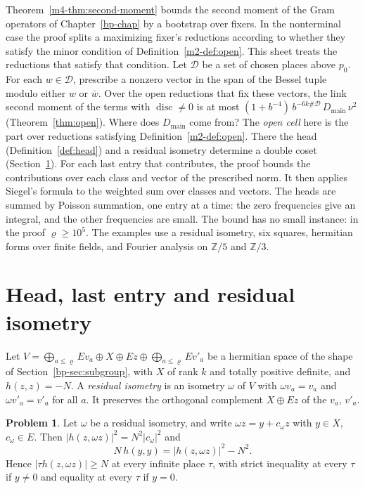\documentclass[reqno]{amsart}
\newcounter{chap}
\theoremstyle{definition}
\newtheorem{problem}{Problem}[section]
\theoremstyle{plain}
\theoremstyle{remark}
\newcommand{\Z}{\mathbb{Z}}
\newcommand{\Dc}{\mathcal{D}}
\newcommand{\disc}{\operatorname{disc}}
\newcommand{\Dm}{D_{\mathrm{main}}}
\begin{document}
\medskip
Theorem~\ref{m4-thm:second-moment} bounds the second moment of the Gram operators of Chapter~\ref{bp-chap} by a bootstrap over fixers.  In the nonterminal case the proof splits a maximizing fixer's reductions according to whether they satisfy the minor condition of Definition~\ref{m2-def:open}.  This sheet treats the reductions that satisfy that condition.  Let \(\Dc\) be a set of chosen places above \(p_0\).  For each \(w\in\Dc\), prescribe a nonzero vector in the span of the Bessel tuple modulo either \(w\) or \(\bar w\).  Over the open reductions that fix these vectors, the link second moment of the terms with \(\disc\ne0\) is at most \((1+b^{-4})\,b^{-6k\#\Dc}\,\Dm\,\nu^2\) (Theorem~\ref{thm:open}).  Where does \(\Dm\) come from?  The \emph{open cell} here is the part over reductions satisfying Definition~\ref{m2-def:open}.  There the head (Definition~\ref{def:head}) and a residual isometry determine a double coset (Section~\ref{sec:last}).  For each last entry that contributes, the proof bounds the contributions over each class and vector of the prescribed norm.  It then applies Siegel's formula to the weighted sum over classes and vectors.  The heads are summed by Poisson summation, one entry at a time: the zero frequencies give an integral, and the other frequencies are small.  The bound has no small instance: in the proof \(\varrho\ge10^5\).  The examples use a residual isometry, six squares, hermitian forms over finite fields, and Fourier analysis on \(\Z/5\) and \(\Z/3\).

\section{Head, last entry and residual isometry}\label{sec:last}

Let \(V=\bigoplus_{a\le\varrho}Ev_a\oplus X\oplus Ez\oplus\bigoplus_{a\le\varrho}Ev'_a\) be a hermitian space of the shape of Section~\ref{bp-sec:subgroup}, with \(X\) of rank \(k\) and totally positive definite, and \(h(z,z)=-N\).  A \emph{residual isometry} is an isometry \(\omega\) of \(V\) with \(\omega v_a=v_a\) and \(\omega v'_a=v'_a\) for all \(a\).  It preserves the orthogonal complement \(X\oplus Ez\) of the \(v_a\), \(v'_a\).

\begin{problem}\label{pr:last-entry}
Let \(\omega\) be a residual isometry, and write \(\omega z=y+c_\omega z\) with \(y\in X\), \(c_\omega\in E\).  Then \(\lvert h(z,\omega z)\rvert^2=N^2\lvert c_\omega\rvert^2\) and
\[
 N\,h(y,y)=\lvert h(z,\omega z)\rvert^2-N^2 .
\]
Hence \(\lvert\tau h(z,\omega z)\rvert\ge N\) at every infinite place \(\tau\), with strict inequality at every \(\tau\) if \(y\ne0\) and equality at every \(\tau\) if \(y=0\).
\end{problem}
\end{document}
